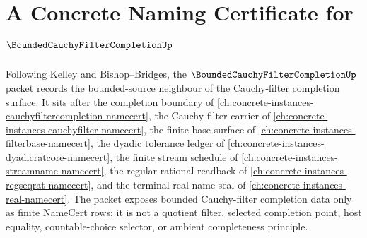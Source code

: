 \chapter{A Concrete Naming Certificate for $\BoundedCauchyFilterCompletionUp$}
\label{ch:concrete-instances-bounded-cauchy-filter-completion-namecert}

Following Kelley and Bishop--Bridges, the $\BoundedCauchyFilterCompletionUp$ packet records the bounded-source neighbour of the Cauchy-filter completion surface. It sits after the completion boundary of \autoref{ch:concrete-instances-cauchyfiltercompletion-namecert}, the Cauchy-filter carrier of \autoref{ch:concrete-instances-cauchyfilter-namecert}, the finite base surface of \autoref{ch:concrete-instances-filterbase-namecert}, the dyadic tolerance ledger of \autoref{ch:concrete-instances-dyadicratcore-namecert}, the finite stream schedule of \autoref{ch:concrete-instances-streamname-namecert}, the regular rational readback of \autoref{ch:concrete-instances-regseqrat-namecert}, and the terminal real-name seal of \autoref{ch:concrete-instances-real-namecert}. The packet exposes bounded Cauchy-filter completion data only as finite NameCert rows; it is not a quotient filter, selected completion point, host equality, countable-choice selector, or ambient completeness principle.


